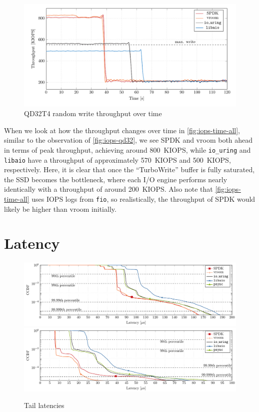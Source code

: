 \begin{figure}
  \centering
    \includegraphics[width=\textwidth]{figures/iops-time-tmp}
    \caption{QD32T4 random write throughput over time}
    \label{fig:iops-time-all}
\end{figure}

When we look at how the throughput changes over time in \autoref{fig:iops-time-all}, similar to the observation of \autoref{fig:iops-qd32}, we see SPDK and vroom both ahead in terms of peak throughput, achieving around \qty{800}{KIOPS}, while \texttt{io\_uring} and \texttt{libaio} have a throughput of approximately \qty{570}{KIOPS} and \qty{500}{KIOPS}, respectively. Here, it is clear that once the ``TurboWrite'' buffer is fully saturated, the SSD becomes the bottleneck, where each I/O engine performs nearly identically with a throughput of around \qty{200}{KIOPS}. Also note that \autoref{fig:iops-time-all} uses IOPS logs from \texttt{fio}, so realistically, the throughput of SPDK would likely be higher than vroom initially.

\section{Latency}
\begin{figure}
  \centering
   {\includegraphics[width=\textwidth]{figures/latency-ccdf-read} \label{fig:ccdf-read}}
   {\includegraphics[width=\textwidth]{figures/latency-ccdf-write} \label{fig:ccdf-write}}
  \caption{Tail latencies}
  \label{fig:ccdf}
\end{figure}

